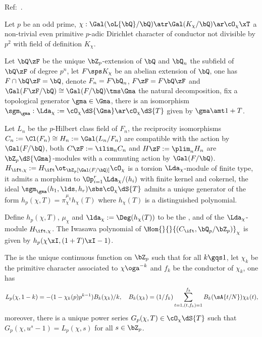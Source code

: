 \documentclass[article, a4paper, twoside]{universal}
\begin{document}
Ref:~\cite{MW1984}.

\begin{stp}
    Let $p$ be an odd prime, $\chi:\Gal(\oL{\bQ}/\bQ)\atr\Gal(K_{\chi}/\bQ)\ar\cO_{\chi}\xT$ a non-trivial even primitive $p$-adic Dirichlet character of conductor not divisible by $p^{2}$ with field of definition $K_{\chi}$.
\end{stp}

\begin{stp}
	Let $\bQ\zF$ be the unique $\bZ_{p}$-extension of $\bQ$ and $\bQ_{n}$ the subfield of $\bQ\zF$ of degree $p^{n}$, let $F\sps K_{\chi}$ be an abelian extension of $\bQ$, one has $F\cap\bQ\zF=\bQ$, denote $F_{n}=F\bQ_{n}$, $F\zF=F\bQ\zF$ and $\Gal(F\zF/\bQ)\cong\Gal(F/\bQ)\tms\Gma$ the natural decomposition, fix a topological generator $\gma\in\Gma$, there is an isomorphism $\sgm_{\gma}:\Lda_{\chi}:=\cO_{\chi}\dS{\Gma}\ar\cO_{\chi}\dS{T}$ given by $\gma\amt1+T$.

	Let $L_{n}$ be the $p$-Hilbert class field of $F_{n}$, the reciprocity isomorphisms $C_{n}:=\Cl(F_{n})\cong H_{n}:=\Gal(L_{n}/F_{n})$ are compatible with the action by $\Gal(F/\bQ)$, both $C\zF:=\ilim_{n}C_{n}$ and $H\zF:=\plim_{n}H_{n}$ are $\bZ_{p}\dS{\Gma}$-modules with a commuting action by $\Gal(F/\bQ)$. $H_{\ift,\chi}:=H_{\ift}\ot_{\bZ_{p}[\Gal(F/\bQ)]}\cO_{\chi}$ is a torsion $\Lda_{\chi}$-module of finite type, it admits a morphism to $\Op_{i=1}^{r}\Lda_{\chi}/(h_{i})$ with finite kernel and cokernel, the ideal $\sgm_{\gma}(h_{1},\lds,h_{r})\sbs\cO_{\chi}\dS{T}$ admits a unique generator of the form $h_{p}(\chi,T)=\pi_{\chi}^{\mu_{\chi}}h_{\chi}(T)$ where $h_{\chi}(T)$ is a distinguished polynomial.

	Define $h_{p}(\chi,T)$, $\mu_{\chi}$ and $\lda_{\chi}:=\Deg(h_{\chi}(T))$ to be the ,  and  of the $\Lda_{\chi}$-module $H_{\ift,\chi}$. The Iwasawa polynomial of $\Hom{}{}{(C_{\ift},\bQ_{p}/\bZ_{p})}_{\chi}$ is given by $h_{p}(\chi\xI,(1+T)\xI-1)$.
\end{stp}

\begin{stp}
	The  is the unique continuous function on $\bZ_{p}$ such that for all $k\gqs1$, let $\chi_{k}$ be the primitive character associated to $\chi\oga^{-k}$ and $f_{k}$ be the conductor of $\chi_{k}$, one has
	\[
		L_{p}(\chi,1-k)=-(1-\chi_{k}(p)p^{k-1})B_{k}(\chi_{k})/k,\quad B_{k}(\chi_{k})=(1/f_{k})\sum_{t=1, (t,f_{k})=1}^{f_{k}}B_{k}(\sA{t/N})\chi_{k}(t),
	\]
	moreover, there is a unique power series $G_{p}(\chi,T)\in\cO_{\chi}\dS{T}$ such that $G_{p}(\chi,u^{s}-1)=L_{p}(\chi,s)$ for all $s\in\bZ_{p}$. 
\end{stp}
\end{document}
